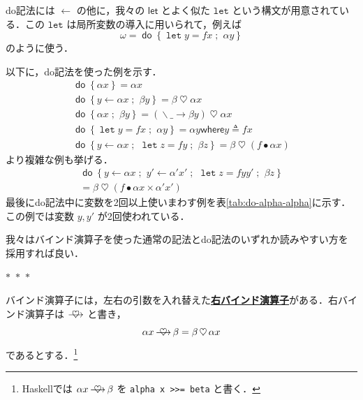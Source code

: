 \documentclass[a4paper,twocolumn]{jsbook}
\newcommand{\Langle}{\langle\!\langle}
\newcommand{\Rangle}{\rangle\!\rangle}
\newcommand{\separator}{\begin{center}$*$~$*$~$*$\end{center}}
\newcommand{\programminglanguage}[1]{\textsf{#1}}
\newcommand{\haskell}{\programminglanguage{Haskell}}
\newcommand{\keyword}[1]{{\underline{\textbf{#1}}}}
\newcommand{\code}[1]{\texttt{#1}}
\newcommand{\mKeyword}[1]{\mathsf{#1}} %
\newcommand{\mVarKeyword}[1]{\texttt{#1}} %
\newcommand{\mDoKeyword}{\mKeyword{do}}
\newcommand{\mDoLetKeyword}{\mVarKeyword{let}}
\newcommand{\mLetKeyword}{\mKeyword{let}}
\newcommand{\mWhereKeyword}{\mKeyword{where}}
\DeclareMathOperator{\mDoKW}{\mDoKeyword}
\newcommand{\mAnyParam}{\_}
\DeclareMathOperator{\mAppMap}{\times}
\DeclareMathOperator{\mBind}{\heartsuit}
\DeclareMathOperator{\mBindRight}{\ooalign{$\longrightarrow$\crcr\hss$\mBind$\hss}}
\DeclareMathOperator{\mDoEq}{\leftarrow}
\DeclareMathOperator{\mDoLetEq}{\mVarKeyword{=}}
\DeclareMathOperator{\mDoNext}{;\;}%
\DeclareMathOperator{\mLambda}{\backslash}
\DeclareMathOperator{\mLambdaArrow}{\rightarrow}
\DeclareMathOperator{\mLetEq}{\triangleq}
\DeclareMathOperator{\mMap}{\bullet}
\newcommand{\mFuncWith}[1]{\Langle#1\Rangle}
\newcommand{\mDo}[1]{\mDoKW\left\{#1\right\}}
\newcommand{\mDoLet}[2]{\mathop{\mDoLetKeyword}#1\mDoLetEq#2}
\newcommand{\mLambdaExp}[2]{\mLambda{#1}\mLambdaArrow{#2}}
\newcommand{\mWhereIs}[2]{\mathbin{\mWhereKeyword}#1\mLetEq#2}
\begin{document}
do記法には $\mDoEq$ の他に，我々の $\mLetKeyword$ とよく似た $\mDoLetKeyword$ という構文が用意されている．この $\mDoLetKeyword$ は局所変数の導入に用いられて，例えば
\begin{equation}
\omega=\mDo{\mDoLet{y}{fx}\mDoNext\alpha y}
\end{equation}
のように使う．

以下に，do記法を使った例を示す．
\begin{gather}
\mDo{\alpha x}=\alpha x\\
\mDo{y\mDoEq\alpha x\mDoNext\beta y}=\beta\mBind\alpha x\\
\mDo{\alpha x\mDoNext\beta y}=(\mLambdaExp{\mAnyParam}{\beta y})\mBind \alpha x\label{eq:do-alpha-beta}\\
\mDo{\mDoLet{y}{fx}\mDoNext\alpha y}=\alpha y\mWhereIs{y}{fx}\\
\mDo{y\mDoEq\alpha x\mDoNext\mDoLet{z}{fy}\mDoNext\beta z}
=\beta\mBind{}(f\mMap\alpha x)
\end{gather}
より複雑な例も挙げる．
\begin{multline}
\mDo{y\mDoEq\alpha x\mDoNext y'\mDoEq\alpha'x'\mDoNext\mDoLet{z}{fyy'}
\mDoNext\beta z}\\
=\beta\mBind{}(f\mMap\alpha x\mAppMap\alpha'x')
\end{multline}
最後にdo記法中に変数を2回以上使いまわす例を表\ref{tab:do-alpha-alpha}に示す．この例では変数 $y,y'$ が2回使われている．




我々はバインド演算子を使った通常の記法とdo記法のいずれか読みやすい方を採用すれば良い．



\separator

バインド演算子には，左右の引数を入れ替えた\keyword{右バインド演算子}がある．右バインド演算子は $\mBindRight$ と書き，
\begin{equation}
\alpha x\mBindRight\beta=\beta\mBind\alpha x
\end{equation}
であるとする．\footnote{\haskell では $\alpha x\mBindRight\beta$ を \code{alpha x >>= beta} と書く．}
\end{document}
